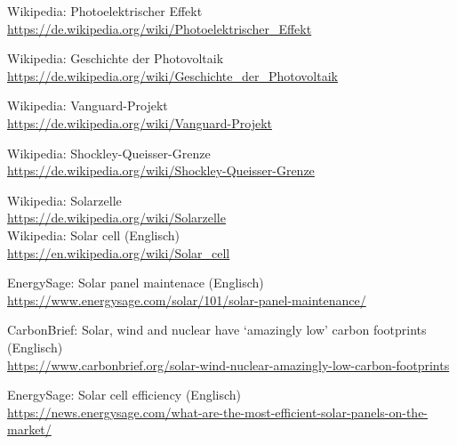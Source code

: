 \newpage
\begin{thebibliography}{99}

    Wikipedia: Photoelektrischer Effekt\\
    \href{https://de.wikipedia.org/wiki/Photoelektrischer_Effekt}{
        https://de.wikipedia.org/wiki/Photoelektrischer\_Effekt
    }

    Wikipedia: Geschichte der Photovoltaik\\
    \href{https://de.wikipedia.org/wiki/Geschichte_der_Photovoltaik}{
        https://de.wikipedia.org/wiki/Geschichte\_der\_Photovoltaik
    }

    Wikipedia: Vanguard-Projekt\\
    \href{https://de.wikipedia.org/wiki/Vanguard-Projekt}{
        https://de.wikipedia.org/wiki/Vanguard-Projekt
    }

    Wikipedia: Shockley-Queisser-Grenze\\
    \href{https://de.wikipedia.org/wiki/Shockley-Queisser-Grenze}{
        https://de.wikipedia.org/wiki/Shockley-Queisser-Grenze
    }

    Wikipedia: Solarzelle\\
    \href{https://de.wikipedia.org/wiki/Solarzelle}{
        https://de.wikipedia.org/wiki/Solarzelle
    }\\
    Wikipedia: Solar cell (Englisch)\\
    \href{https://en.wikipedia.org/wiki/Solar_cell}{
        https://en.wikipedia.org/wiki/Solar\_cell
    }

    EnergySage: Solar panel maintenace (Englisch)\\
    \href{https://www.energysage.com/solar/101/solar-panel-maintenance/}{
        https://www.energysage.com/solar/101/solar-panel-maintenance/
    }

    CarbonBrief: Solar, wind and nuclear have ‘amazingly low’ carbon footprints (Englisch)\\
    \href{https://www.carbonbrief.org/solar-wind-nuclear-amazingly-low-carbon-footprints}{
        https://www.carbonbrief.org/solar-wind-nuclear-amazingly-low-carbon-footprints
    }

    EnergySage: Solar cell efficiency (Englisch)\\
    \href{https://news.energysage.com/what-are-the-most-efficient-solar-panels-on-the-market/}{
        https://news.energysage.com/what-are-the-most-efficient-solar-panels-on-the-market/
    }


\end{thebibliography}
